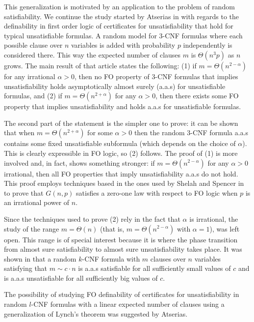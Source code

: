\documentclass[12pt,notitlepage,a4paper]{article}
\theoremstyle{definition}
\begin{document}
This generalization is motivated by an application to the problem of random 
satisfiability. We continue the study started by Atserias in 
\cite{atserias2005definability}
with regards to the definability in first order
logic of certificates for unsatisfiability
that hold for typical unsatisfiable formulas. 
A random model for $3$-CNF formulas where 
each possible clause over $n$ variables 
is added with probability $p$ independently is considered there.
This way the expected number of clauses $m$ is $\Theta(n^3p)$ as $n$ grows.
The main result of that article states the following:
(1) if $m=\Theta(n^{2-\alpha})$ 
for any irrational $\alpha>0$, then no FO property of $3$-CNF formulas
that implies unsatisfiability holds asymptotically almost surely (a.a.s) 
for unsatisfiable formulas, and (2) if $m=\Theta(n^{2+\alpha})$ for any $\alpha>0$,
then there exists some FO property that implies
unsatisfiability and  holds a.a.s for unsatisfiable formulas. \par
The second part of the statement is the simpler one to prove:
it can be shown that when $m=\Theta(n^{2+\alpha})$ for some 
$\alpha>0$ then the random $3$-CNF formula
a.a.s contains some fixed unsatisfiable subformula (which depends
on the choice of $\alpha$). This is clearly expressible in FO logic, 
so (2) follows. The proof of (1) is more involved and, in fact, 
shows something stronger: if $m=\Theta(n^{2-\alpha})$
for any $\alpha>0$ irrational, then all FO properties 
that imply unsatisfiability
a.a.s do not hold. This proof employs
techniques based in the ones used by Shelah and Spencer 
in \cite{shelah1988zero} to prove that $G(n,p)$ satisfies a 
zero-one law with respect to FO logic when $p$ is an irrational 
power of $n$. \par
Since the techniques used to prove (2) rely in the fact that $\alpha$
is irrational, the study of the range $m=\Theta(n)$
(that is, $m=\Theta(n^{2-\alpha})$ with $\alpha=1$), was left open.
This range is of special interest because it is where the phase 
transition from almost sure satisfiability to almost sure unsatisfiability
takes place. It was shown
in \cite{chvatal1992mick} that a random $k$-CNF formula with
$m$ clauses over $n$ variables satisfying that $m\sim c\cdot n$ 
is a.a.s satisfiable for all sufficiently small values of $c$ and is a.a.s
unsatisfiable for all sufficiently big values of $c$.
\par
The possibility of studying FO definability of certificates for unsatisfiability
in random $l$-CNF formulas with a linear expected number of clauses 
using a generalization of Lynch's theorem was suggested by Atserias. 
\end{document}
